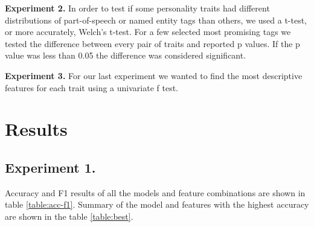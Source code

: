 \documentclass[10pt, a4paper]{article}
\begin{document}
\textbf{Experiment 2.}  In order to test if some personality traits had different distributions of part-of-speech or named entity tags than others, we used a t-test, or more accurately, Welch’s t-test.
For a few selected most promising tags we tested the difference between every pair of traits and reported p values.
If the p value was less than 0.05 the difference was considered significant.

\textbf{Experiment 3.} For our last experiment we wanted to find the most descriptive features for each trait using a univariate f test.

\section{Results}

\subsection{Experiment 1.}
Accuracy and F1 results of all the models and feature combinations are shown in table \ref{table:acc-f1}.
Summary of the model and features with the highest accuracy are shown in the table \ref{table:best}.
\end{document}
